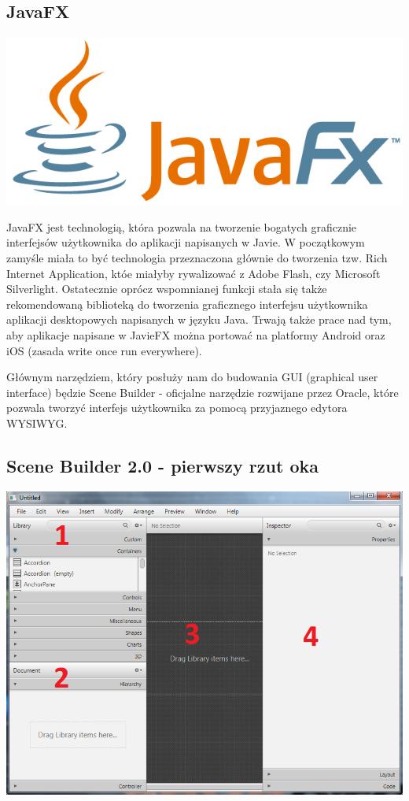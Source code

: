 \documentclass[letterpaper,10pt,english]{sphinxmanual}
\begin{document}
\subsection{JavaFX}
\label{gui:javafx}
{\hfill\includegraphics{javafx.png}\hfill}

JavaFX jest technologią, która pozwala na tworzenie bogatych graficznie interfejsów użytkownika do aplikacji napisanych w Javie. W początkowym zamyśle miała to być technologia przeznaczona głównie do tworzenia tzw. Rich Internet Application, któe miałyby rywalizować z Adobe Flash, czy Microsoft Silverlight. Ostatecznie oprócz wspomnianej funkcji stała się także rekomendowaną biblioteką do tworzenia graficznego interfejsu użytkownika aplikacji desktopowych napisanych w języku Java. Trwają także prace nad tym, aby aplikacje napisane w JavieFX można portować na platformy Android oraz iOS (zasada write once run everywhere).

Głównym narzędziem, który posłuży nam do budowania GUI (graphical user interface) będzie Scene Builder - oficjalne narzędzie rozwijane przez Oracle, które pozwala tworzyć interfejs użytkownika za pomocą przyjaznego edytora WYSIWYG.


\subsection{Scene Builder 2.0 - pierwszy rzut oka}
\label{gui:scene-builder-2-0-pierwszy-rzut-oka}
{\hfill\includegraphics{scenebuilder1.png}\hfill}
\end{document}
